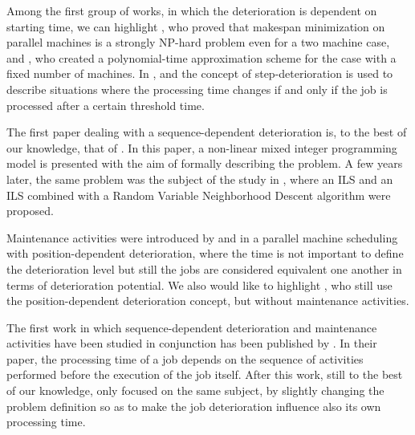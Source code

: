 \documentclass[a4paper,11pt]{article}
\begin{document}
Among the first group of works, in which the deterioration is dependent on starting time, we can highlight \cite{Mosheiov1998}, who proved that makespan minimization on parallel machines is a strongly NP-hard problem even for a two machine case, and \cite{JI2008342}, who created a polynomial-time approximation scheme for the case with a fixed number of machines. In \cite{cheng2001single}, \cite{leung2008minimizing} and \cite{lalla2016modeling} the concept of step-deterioration is used to describe situations where the processing time changes if and only if the job is processed after a certain threshold time. 
 
 The first paper dealing with a sequence-dependent deterioration is, to the best of our knowledge, that of \cite{RUIZTORRES20132051}. In this paper, a non-linear mixed integer programming model is presented with the aim of formally describing the problem. A few years later, the same problem was the subject of the study in \cite{SantosArroyo2015}, where an ILS and an ILS combined with a Random Variable Neighborhood Descent algorithm were proposed. 
 
Maintenance activities were introduced by \cite{Yang2011} and \cite{YANG20121458} in a parallel machine scheduling with position-dependent deterioration, where the time is not important to define the deterioration level but still the jobs are considered equivalent one another in terms of deterioration potential. We also would like to highlight \cite{HUANG20152897}, who still use the position-dependent deterioration concept, but without maintenance activities.
 
The first work in which sequence-dependent deterioration and maintenance activities have been studied in conjunction has been published by \cite{ruiz2017makespan}. In their paper, the processing time of a job depends on the sequence of activities performed before the execution of the job itself. After this work, still to the best of our knowledge, only \cite{DING201935} focused on the same subject, by slightly changing the problem definition so as to make the job deterioration influence also its own processing time. 
 
\end{document}

